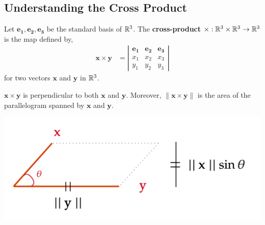 \subsection{Understanding the Cross Product}
\begin{defn}
     Let $\mathbf{e_1}, \mathbf{e_2}, \mathbf{e_3}$ be the standard basis of $\mathbb{R}^3$. The \textbf{cross-product} $\times: \mathbb{R}^3 \times \mathbb{R}^3 \rightarrow \mathbb{R}^3$ is the map defined by,
    \begin{align*}
    \mathbf{x} \times \mathbf{y}
    &=\left|\begin{array}{ccc}
    \mathbf{e_1} & \mathbf{e_2} & \mathbf{e_3} \\
    x_1 & x_2 & x_3 \\
    y_1 & y_2 & y_3
    \end{array}\right|
    \end{align*}
    for two vectors $\mathbf{x}$ and $\mathbf{y}$ in $\mathbb{R}^3$.
\end{defn}

\begin{marginfigure}
    $\mathbf{x} \times \mathbf{y}$ is perpendicular to both $\mathbf{x}$ and $\mathbf{y}$. Moreover, $\|\mathbf{x} \times \mathbf{y}\|$ is the area of the parallelogram spanned by $\mathbf{x}$ and $\mathbf{y}$.
    \begin{center}
           \includegraphics[width=\textwidth]{figures/wk-1/fig-3.png}
    \end{center}
\end{marginfigure}

